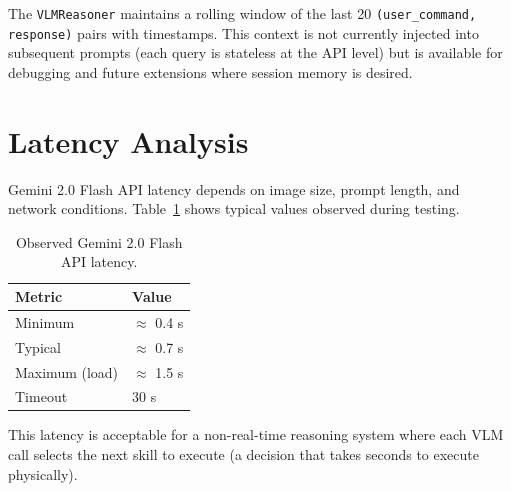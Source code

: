 The \texttt{VLMReasoner} maintains a rolling window of the last 20
\texttt{(user\_command, response)} pairs with timestamps.
This context is not currently injected into subsequent prompts (each query is
stateless at the API level) but is available for debugging and future extensions
where session memory is desired.

\section{Latency Analysis}

Gemini 2.0 Flash API latency depends on image size, prompt length, and network
conditions.
Table~\ref{tab:vlm_latency} shows typical values observed during testing.

\begin{table}[H]
\centering
\caption{Observed Gemini 2.0 Flash API latency.}
\label{tab:vlm_latency}
\begin{tabular}{ll}
\toprule
\textbf{Metric} & \textbf{Value} \\
\midrule
Minimum         & $\approx$ 0.4 s \\
Typical         & $\approx$ 0.7 s \\
Maximum (load)  & $\approx$ 1.5 s \\
Timeout         & 30 s \\
\bottomrule
\end{tabular}
\end{table}

This latency is acceptable for a non-real-time reasoning system where each VLM call
selects the next skill to execute (a decision that takes seconds to execute physically).
